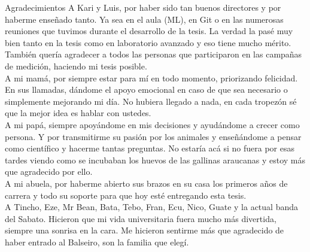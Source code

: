 \documentclass[12pt,screen,twoside,pagebackref]{ibtesis}
\begin{document}
\begin{postliminary}


\begin{seccion}{Agradecimientos}
A Kari y Luis, por haber sido tan buenos directores y por haberme enseñado tanto. Ya sea en el aula (ML), en Git o en las numerosas reuniones que tuvimos durante el desarrollo de la tesis. La verdad la pasé muy bien tanto en la tesis como en laboratorio avanzado y eso tiene mucho mérito. También quería agradecer a todos las personas que participaron en las campañas de medición, haciendo mi tesis posible. \\

A mi mamá, por siempre estar para mí en todo momento, priorizando felicidad. En sus llamadas, dándome el apoyo emocional en caso de que sea necesario o simplemente mejorando mi día. No hubiera llegado a nada, en cada tropezón sé que la mejor idea es hablar con ustedes. \\

A mi papá, siempre apoyándome en mis decisiones y ayudándome a crecer como persona. Y por transmitirme su pasión por los animales y enseñándome a pensar como científico y hacerme tantas preguntas. No estaría acá si no fuera por esas tardes viendo como se incubaban los huevos de las gallinas araucanas y estoy más que agradecido por ello. \\

A mi abuela, por haberme abierto sus brazos en su casa los primeros años de carrera y todo su soporte para que hoy esté entregando esta tesis.\\



A Tincho, Eze, Mr Bean, Bata, Tebo, Fran, Ecu, Nico, Guate y la actual banda del Sabato. Hicieron que mi vida universitaria fuera mucho más divertida, siempre una sonrisa en la cara. Me hicieron sentirme más que agradecido de haber entrado al Balseiro, son la familia que elegí. 
\end{seccion}

\end{postliminary}
\end{document}
